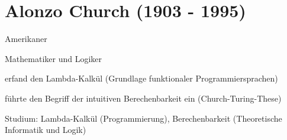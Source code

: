 \documentclass[a4paper,12pt]{report}
\begin{document}
\section*{Alonzo Church (1903 - 1995)}
\begin{itemize*}
	\item Amerikaner
	\item Mathematiker und Logiker
	\item erfand den Lambda-Kalkül (Grundlage funktionaler Programmiersprachen)
	\item führte den Begriff der intuitiven Berechenbarkeit ein (Church-Turing-These)
	\item Studium: Lambda-Kalkül (Programmierung), Berechenbarkeit (Theoretische Informatik
		  und Logik)
\end{itemize*}

\pagebreak
\end{document}
